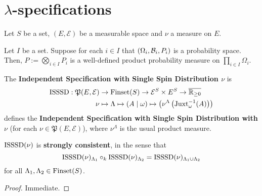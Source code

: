 \section{\texorpdfstring{$\lambda$}{Lambda}-specifications}

Let $S$ be a set, $(E, \mathcal{E})$ be a measurable space and $\nu$ a measure on $E$.

\begin{definition}
    \label{def:product-probability-measure}
    \leanok{}

    Let $I$ be a set. Suppose for each $i\in I$ that $(\Omega_i,\mathcal B_i,P_i)$ is a probability space. Then, $P:=\bigotimes_{i\in I}P_i$ is a well-defined product probability measure on $\prod_{i\in I}\Omega_i$.
\end{definition}

\begin{definition}
    \label{def:isssd}

    The \textbf{Independent Specification with Single Spin Distribution $\nu$} is
    \begin{align}
        \operatorname{ISSSD}:\mathfrak{P}(E, \mathcal{E})&\to\operatorname{Finset}(S)\to\mathcal{E}^S\times E^S\to\overline{\mathbb{R}_{\geq0}}\\
        \nu&\mapsto\Lambda\mapsto(A\mid\omega)\mapsto\left(\nu^\Lambda\left(\operatorname{Juxt}_{\omega}^{-1}(A)\right)\right)
    \end{align}
    defines the \textbf{Independent Specification with Single Spin Distribution with $\nu$} (for each $\nu\in\mathfrak{P}(E, \mathcal{E})$), where $\nu^\Lambda$ is the usual product measure.
\end{definition}

\begin{lemma}
    \label{lem:isssd-strong-consistency}
    \leanok{}

    $\operatorname{ISSSD}(\nu)$ is {\bf strongly consistent}, in the sense that
    \[\operatorname{ISSSD}(\nu)_{\Lambda_1} \circ_k \operatorname{ISSSD}(\nu)_{\Lambda_2} = \operatorname{ISSSD}(\nu)_{\Lambda_1 \cup \Lambda_2}\]
    for all $\Lambda_1, \Lambda_2 \in \operatorname{Finset}(S)$.
\end{lemma}
\begin{proof}

  Immediate.
\end{proof}

